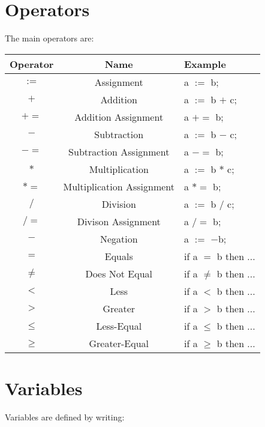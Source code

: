 \section{Operators}

The main operators are:

\begin{center}
\begin{tabular}{c|c|l}
\textbf{Operator} & \textbf{Name} & \textbf{Example} \\
\hline
$:=$ & Assignment & a $:=$ b; \\
$+$ & Addition & a $:=$ b $+$ c; \\
$+=$ & Addition Assignment & a $+=$ b; \\
$-$ & Subtraction & a $:=$ b $-$ c; \\
$-=$ & Subtraction Assignment & a $-=$ b; \\
$*$ & Multiplication & a $:=$ b $*$ c; \\
$*=$ & Multiplication Assignment & a $*=$ b; \\
$/$ & Division & a $:=$ b $/$ c; \\
$/=$ & Divison Assignment & a $/=$ b; \\
$-$ & Negation & a $:=$ $-$b; \\
$=$ & Equals & if a $=$ b then ... \\
$\ne$ & Does Not Equal & if a $\ne$ b then ... \\
$<$ & Less & if a $<$ b then ... \\
$>$ & Greater & if a $>$ b then ... \\
$\le$ & Less-Equal & if a $\le$ b then ... \\
$\ge$ & Greater-Equal & if a $\ge$ b then ...
\end{tabular}
\end{center}

\section{Variables}

Variables are defined by writing:

